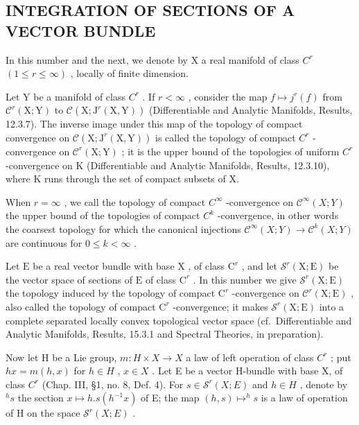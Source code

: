 \subsection{INTEGRATION OF SECTIONS OF A VECTOR BUNDLE}

In this number and the next, we denote by X a real manifold of class \(C^{r}\) \((1 \leq r \leq \infty)\) , locally of finite dimension.

Let Y be a manifold of class \(C^{r}\) . If \(r < \infty\) , consider the map \(f \mapsto j^{r}(f)\) from \(\mathcal{C}^{r}(\mathrm{X};\mathrm{Y})\) to \(\mathcal{C}(\mathrm{X};\mathrm{J}^{r}(\mathrm{X},\mathrm{Y}))\) (Differentiable and Analytic Manifolds, Results, 12.3.7). The inverse image under this map of the topology of compact convergence on \(\mathcal{C}(\mathrm{X};\mathrm{J}^{r}(\mathrm{X},\mathrm{Y}))\) is called the topology of compact \(C^{r}\) -convergence on \(\mathcal{C}^{r}(\mathrm{X};\mathrm{Y})\) ; it is the upper bound of the topologies of uniform \(C^{r}\) -convergence on K (Differentiable and Analytic Manifolds, Results, 12.3.10), where K runs through the set of compact subsets of X.

When \(r = \infty\) , we call the topology of compact \(C^{\infty}\) -convergence on \(\mathcal{C}^{\infty}(X;Y)\) the upper bound of the topologies of compact \(C^{k}\) -convergence, in other words the coarsest topology for which the canonical injections \(\mathcal{C}^{\infty}(X;Y) \to \mathcal{C}^{k}(X;Y)\) are continuous for \(0 \leq k < \infty\) .

Let \(\mathrm{E}\) be a real vector bundle with base \(\mathrm{X}\) , of class \(\mathrm{C}^r\) , and let \(\mathcal{S}^r(\mathrm{X};\mathrm{E})\) be the vector space of sections of \(\mathrm{E}\) of class \(\mathrm{C}^r\) . In this number we give \(\mathcal{S}^r(\mathrm{X};\mathrm{E})\) the topology induced by the topology of compact \(\mathrm{C}^r\) -convergence on \(\mathcal{C}^r(\mathrm{X};\mathrm{E})\) , also called the topology of compact \(\mathrm{C}^r\) -convergence; it makes \(\mathcal{S}^r (\mathrm{X};\mathrm{E})\) into a complete separated locally convex topological vector space (cf.~Differentiable and Analytic Manifolds, Results, 15.3.1 and Spectral Theories, in preparation).

Now let H be a Lie group, \(m: H \times X \to X\) a law of left operation of class \(C^{r}\) ; put \(hx = m(h, x)\) for \(h \in H\) , \(x \in X\) . Let E be a vector H-bundle with base X, of class \(C^{r}\) (Chap. III, §1, no. 8, Def. 4). For \(s \in \mathcal{S}^{r}(X; E)\) and \(h \in H\) , denote by \(^{h}s\) the section \(x \mapsto h.s(h^{-1}x)\) of E; the map \((h, s) \mapsto ^{h}s\) is a law of operation of H on the space \(\mathcal{S}^{r}(X; E)\) .

